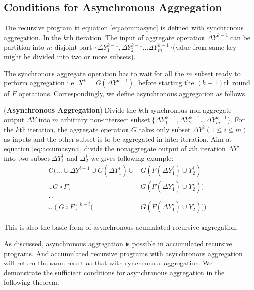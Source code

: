 {	
	
	\subsection{Conditions for Asynchronous Aggregation}
	\label{sec:async:condition}
	The recursive program in equation \ref{eq:accumasync} is defined with synchronous aggregation. 
	In the $k$th iteration, The input of aggregate operation  $\Delta Y^{k-1}$ can be partition into $m$ disjoint part $\{\Delta Y_1^{k-1},\Delta Y_2^{k-1}\ldots \Delta Y_m^{k-1} \}$(value from same key might be divided into two or more subsets).
	
	The synchronous aggregate operation has to wait for all the $m$ subset ready to perform aggregation i.e. $X^k=G(\Delta Y^{k-1})$, before starting the $(k+1)$th round of $F$ operations.  Correspondingly, we define asynchronous aggregation as follows.
	\begin{definition}(\textbf{Asynchronous Aggregation})
		\label{def:asyncaggre}
		Divide the $k$th synchronous non-aggregate output $\Delta Y$ into $m$ arbitrary non-intersect subset $\{\Delta Y_1^{k-1},\Delta Y_2^{k-1}\ldots \Delta Y_m^{k-1} \}$. For the $k$th iteration, the aggregate operation $G$ takes only subset $\Delta Y_{i}^k(1\le i\le m)$ as inputs and the other subset is to be aggregated in later iteration.
		Aim at equation \ref{eq:accumasync}, divide the nonaggregate output of $i$th iteration $\Delta Y^i$ into two subset $\Delta Y^i_1$ and $\Delta^i_2$ we gives following example:
		\begin{equation}
		\begin{aligned}
		G\big(\ldots \cup \Delta Y^{i-1}\cup G(\Delta Y^i_1)  \cup &G(F(\Delta Y^i_1)\cup Y^i_2)\\
		\cup G\circ F(&G(F(\Delta Y^i_1)\cup Y^i_2)) \\
		\ldots\\
		\cup (G\circ F)^{k-i}(&G(F(\Delta Y^i_1)\cup Y^i_2))\big)
		\end{aligned}
		\end{equation}
	\end{definition}
	This is also the basic form of asynchronous acumulated recursive aggregation. 
	
	As discussed, asynchronous aggregation is possible in accumulated recursive programs. And accumulated recursive programs with asynchronous aggregation will return the same result as that with synchronous aggregation. We demonstrate the sufficient conditions for asynchronous aggregation in the following theorem.
	
}
